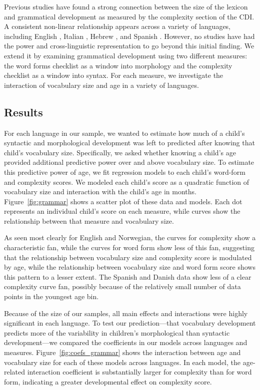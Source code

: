 \documentclass[10pt,letterpaper]{article}
\begin{document}
Previous studies have found a strong connection between the size of the lexicon and grammatical development as measured by the complexity section of the CDI. A consistent non-linear relationship appears across a variety of languages, including English \cite{bates1994,fenson1994}, Italian \cite{caselli1999}, Hebrew \cite{maital2000}, and Spanish \cite{jackson-maldonado2003}. However, no studies have had the power and cross-linguistic representation to go beyond this initial finding. We extend it by examining grammatical development using two different measures: the word forms checklist as a window into morphology and the complexity checklist as a window into syntax. For each measure, we investigate the interaction of vocabulary size and age in a variety of languages.

\subsection{Results}

For each language in our sample, we wanted to estimate how much of a child's syntactic and morphological development was left to predicted after knowing that child's vocabulary size. Specifically, we asked whether knowing a child's age provided additional predictive power over and above vocabulary size. To estimate this predictive power of age, we fit regression models to each child's word-form and complexity scores. We modeled each child's score as a quadratic function of vocabulary size and interaction with the child's age in months. Figure~\ref{fig:grammar} shows a scatter plot of these data and models. Each dot represents an individual child's score on each measure, while curves show the relationship between that measure and vocabulary size. 

As seen most clearly for English and Norwegian, the curves for complexity show a characteristic fan, while the curves for word form show less of this fan, suggesting that the relationship between vocabulary size and complexity score is modulated by age, while the relationship between vocabulary size and word form score shows this pattern to a lesser extent. The Spanish and Danish data show less of a clear complexity curve fan, possibly because of the relatively small number of data points in the youngest age bin.

Because of the size of our samples, all main effects and interactions were highly significant in each language. To test our prediction---that vocabulary development predicts more of the variability in children's morphological than syntactic development---we compared the coefficients in our models across languages and measures. Figure~\ref{fig:coefs_grammar} shows the interaction between age and vocabulary size for each of these models across languages. In each model, the age-related interaction coefficient is substantially larger for complexity than for word form, indicating a greater developmental effect on complexity score. %
\end{document}
